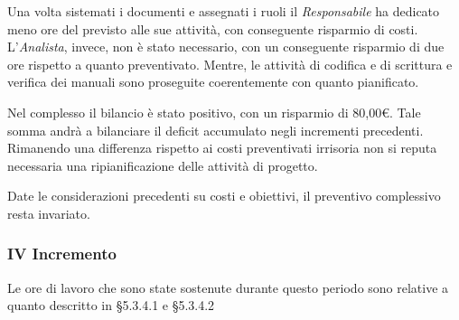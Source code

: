 Una volta sistemati i documenti e assegnati i ruoli il \textit{Responsabile} ha dedicato meno ore del previsto alle sue attività, con conseguente risparmio di costi. L'\textit{Analista}, invece, non è stato necessario, con un conseguente risparmio di due ore rispetto a quanto preventivato. 
Mentre, le attività di codifica e di scrittura e verifica dei manuali sono proseguite coerentemente con quanto pianificato.

Nel complesso il bilancio è stato positivo, con un risparmio di 80,00\euro. Tale somma andrà a bilanciare il deficit accumulato negli incrementi precedenti. Rimanendo una differenza rispetto ai costi preventivati irrisoria non si reputa necessaria una ripianificazione delle attività di progetto.

Date le considerazioni precedenti su costi e obiettivi, il preventivo complessivo resta invariato.


\pagebreak


\subsubsection{IV Incremento}
Le ore di lavoro che sono state sostenute durante questo periodo sono relative a quanto descritto in §5.3.4.1 e §5.3.4.2


